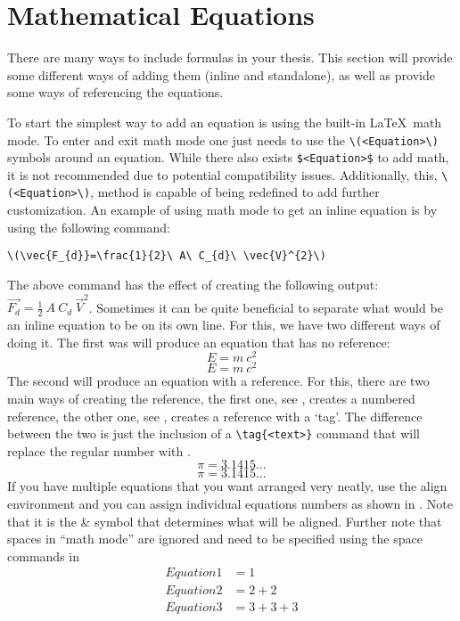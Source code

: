 \chapter{Mathematical Equations}
	There are many ways to include formulas in your thesis. 
	This section will provide some different ways of adding them (inline and standalone), as well as provide some ways of referencing the equations.

	To start the simplest way to add an equation is using the built-in \LaTeX\ math mode. 
	To enter and exit math mode one just needs to use the \lstinline|\(<Equation>\)| symbols around an equation. While there also exists \lstinline|$<Equation>$| to add math, it is not recommended due to potential compatibility issues. Additionally, this, \lstinline|\(<Equation>\)|, method is capable of being redefined to add further customization. 
	An example of using math mode to get an inline equation is by using the following command:
	\begin{center}
		\lstinline|\(\vec{F_{d}}=\frac{1}{2}\ A\ C_{d}\ \vec{V}^{2}\)|
	\end{center}
	The above command has the effect of creating the following output: \(\vec{F_{d}}=\frac{1}{2}\ A\ C_{d}\ \vec{V}^{2}\).
	Sometimes it can be quite beneficial to separate what would be an inline equation to be on its own line. 
	For this, we have two different ways of doing it. 
	The first was will produce an equation that has no reference:
	\[
		E = m\ c^2
	\] %
	\begin{equation*}
		E = m\ c^2
	\end{equation*}
	The second will produce an equation with a reference. 
	For this, there are two main ways of creating the reference, the first one, see , creates a numbered reference, the other one, see , creates a reference with a `tag'. 
	The difference between the two is just the inclusion of a \lstinline|\tag{<text>}| command that will replace the regular number with .
	\begin{equation}
		\label{eq:Eq}
		\pi = 3.1415...
	\end{equation}
	\begin{equation}
		\tag{Constant pi}
		\label{eq:customTag}
		\pi = 3.1415...
	\end{equation}
	If you have multiple equations that you want arranged very neatly, use the align environment and you can assign individual equations numbers as shown in .
	Note that it is the \& symbol that determines what will be aligned.
	Further note that spaces in \enquote{math mode} are ignored and need to be specified using the space commands in %
	\begin{align}%
		\label{eq:multiref:a} Equation1 & = 1\\
		\label{eq:multiref:b} Equation2 & = 2 + 2\\
		\label{eq:multiref:c} Equation3 & = 3 + 3 + 3
	\end{align}
	
